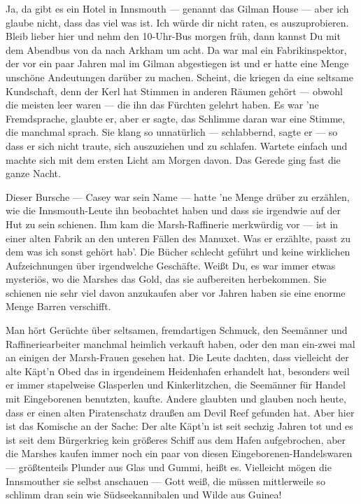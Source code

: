 Ja, da gibt es ein Hotel in Innsmouth --- genannt das Gilman House --- aber ich glaube nicht, dass das viel was ist. Ich würde dir nicht raten, es auszuprobieren. Bleib lieber hier und nehm den 10-Uhr-Bus morgen früh, dann kannst Du mit dem Abendbus von da nach Arkham um acht. Da war mal ein Fabrikinspektor, der vor ein paar Jahren mal im Gilman abgestiegen ist und er hatte eine Menge unschöne Andeutungen darüber zu machen. Scheint, die kriegen da eine seltsame Kundschaft, denn der Kerl hat Stimmen in anderen Räumen gehört --- obwohl die meisten leer waren --- die ihn das Fürchten gelehrt haben. Es war 'ne Fremdsprache, glaubte  er, aber er sagte, das Schlimme daran war eine Stimme, die manchmal sprach. Sie klang so unnatürlich --- schlabbernd, sagte er --- so dass er sich nicht traute, sich auszuziehen und zu schlafen. Wartete einfach und machte sich mit dem ersten Licht am Morgen davon. Das Gerede ging fast die ganze Nacht.

Dieser Bursche --- Casey war sein Name --- hatte 'ne Menge drüber zu erzählen, wie die Innsmouth-Leute ihn beobachtet haben und dass sie irgendwie auf der Hut zu sein schienen. Ihm kam die Marsh-Raffinerie merkwürdig vor --- ist in einer alten Fabrik an den unteren Fällen des Manuxet. Was er erzählte, passt zu dem was ich sonst gehört hab'. Die Bücher schlecht geführt und keine wirklichen Aufzeichnungen über irgendwelche Geschäfte. Weißt Du, es war immer etwas mysteriös, wo die Marshes das Gold, das sie aufbereiten herbekommen. Sie schienen nie sehr viel davon anzukaufen aber vor Jahren haben sie eine enorme Menge Barren verschifft.

Man hört Gerüchte über seltsamen, fremdartigen Schmuck, den Seemänner und Raffineriearbeiter manchmal heimlich verkauft haben, oder den man ein-zwei mal an einigen der Marsh-Frauen gesehen hat. Die Leute dachten, dass vielleicht der alte Käpt'n Obed das in irgendeinem Heidenhafen erhandelt hat, besonders weil er immer stapelweise Glasperlen und Kinkerlitzchen, die Seemänner für Handel mit Eingeborenen benutzten, kaufte. Andere glaubten und glauben noch heute, dass er einen alten Piratenschatz draußen am Devil Reef gefunden hat. Aber hier ist das Komische an der Sache: Der alte Käpt'n ist seit sechzig Jahren tot und es ist seit dem Bürgerkrieg kein größeres Schiff aus dem Hafen aufgebrochen, aber die Marshes kaufen immer noch ein paar von diesen Eingeborenen-Handelswaren --- größtenteils Plunder aus Glas und Gummi, heißt es. Vielleicht mögen die Innsmouther sie selbst anschauen --- Gott weiß, die müssen mittlerweile so schlimm dran sein wie Südseekannibalen und Wilde aus Guinea!

